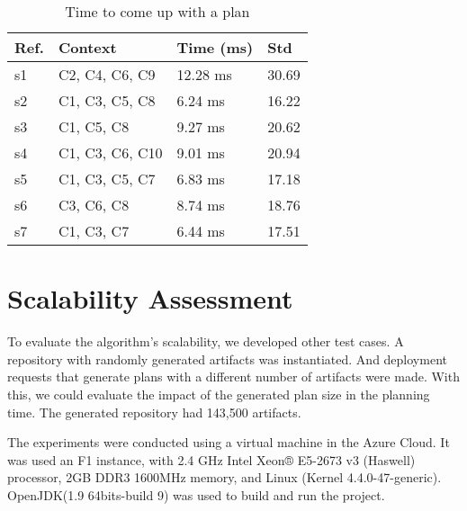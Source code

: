 \begin{table}[!htb]
\centering
\caption{Time to come up with a plan}
\begin{tabular}{|p{0.7cm}|p{3.75cm}|p{2cm}|p{2cm}|}
\hline
  Ref. &
  Context &
  Time (ms) &
  Std \\ \hline

s1 &
C2, C4, C6, C9 &
12.28 ms & 30.69 \\ \hline
s2 &
C1, C3, C5, C8 &
6.24 ms & 16.22 \\ \hline
s3 &
C1, C5, C8 &
9.27 ms & 20.62\\ \hline
s4 &
C1, C3, C6, C10 &
9.01 ms & 20.94 \\ \hline
s5 &
C1, C3, C5, C7 &
6.83 ms & 17.18 \\ \hline
s6 &
C3, C6, C8 &
8.74 ms & 18.76 \\ \hline
s7 &
C1, C3, C7  &
6.44 ms & 17.51 \\ \hline

\end{tabular}
\label{table:planning_time}
\end{table}


\section{Scalability Assessment}

To evaluate the algorithm's scalability, we developed other test cases.  A repository with randomly generated artifacts was instantiated. And deployment requests that generate plans with a different number of artifacts were made. With this, we could evaluate the impact of the generated plan size in the planning time.
The generated repository had 143,500 artifacts.

The experiments were conducted using a virtual machine in the Azure Cloud. It was used an F1 instance, with 2.4 GHz Intel Xeon® E5-2673 v3 (Haswell) processor,
2GB DDR3 1600MHz memory, and Linux (Kernel 4.4.0-47-generic). OpenJDK(1.9 64bits-build 9) was used to build and run the project.

